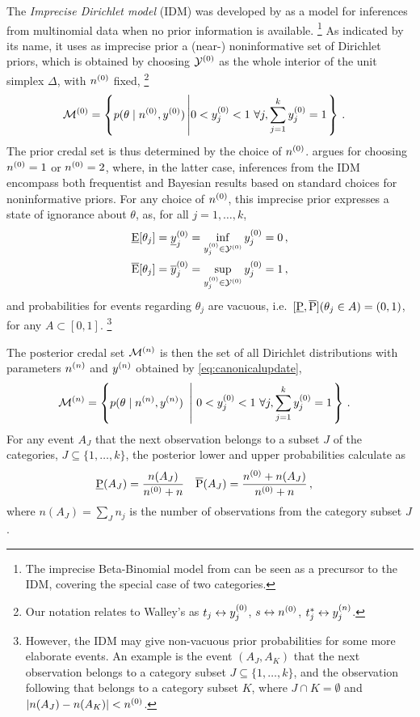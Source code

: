 The \emph{Imprecise Dirichlet model} (IDM) was developed by \textcite{1996:walley::idm}
as a model for inferences from multinomial data when no prior information is available.%
\footnote{The imprecise Beta-Binomial model from \textcite[\S 5.3.2]{1991:walley}
can be seen as a precursor to the IDM, covering the special case of two categories.}
As indicated by its name, it uses as imprecise prior a (near-) noninformative set of Dirichlet priors,
which is obtained by choosing $\mathcal{Y}^{(0)}$ as the whole interior of the unit simplex $\Delta$, with $n^{(0)}$ fixed,%
\footnote{Our notation relates to Walley's \parencite*{1996:walley::idm} as
$t_j \leftrightarrow y^{(0)}_j$, $s \leftrightarrow n^{(0)}$, $t^*_j \leftrightarrow y^{(n)}_j$.}
\begin{align*}
\MZ &= \left\{ p(\theta \mid \nz, \yz) \left| 0 < \yz_j < 1\ \forall j, \sum_{j=1}^k \yz_j = 1 \right. \right\}\,.
\end{align*}
The prior credal set is thus determined by the choice of $n^{(0)}$.
\Textcite{1996:walley::idm} argues for choosing $n^{(0)} = 1$ or $n^{(0)} = 2$, where, in the latter case,
inferences from the IDM encompass both frequentist and Bayesian results based on standard choices for noninformative priors.
For any choice of $n^{(0)}$, this imprecise prior expresses a state of ignorance about $\theta$,
as, for all $j = 1,\ldots, k$,
\begin{align*}
\underline{\operatorname{E}}[\theta_j] &= \underline{y}^{(0)}_j = \inf_{y^{(0)}_j \in \mathcal{Y}^{(0)}} y^{(0)}_j = 0\,,\\
\overline{\operatorname{E}}[\theta_j] &= \overline{y}^{(0)}_j = \sup_{y^{(0)}_j \in \mathcal{Y}^{(0)}} y^{(0)}_j = 1\,,
\end{align*}
and probabilities for events regarding $\theta_j$ are vacuous, i.e.\
$[\underline{\operatorname{P}},\overline{\operatorname{P}}](\theta_j \in A) = (0,1)$, for any $A \subset [0, 1]$.%
\footnote{However, the IDM may give non-vacuous prior probabilities for some more elaborate events.
An example \parencite[p.~14]{1996:walley::idm} is the event $(A_J, A_K)$
that the next observation belongs to a category subset $J \subseteq\{1, \ldots, k\}$,
and the observation following that belongs to a category subset $K$,
where $J \cap K = \emptyset$ and $|n(A_J) - n(A_K)| < n^{(0)}$.}

The posterior credal set $\mathcal{M}^{(n)}$ is then the set of all Dirichlet distributions
with parameters $n^{(n)}$ and $y^{(n)}$ obtained by \eqref{eq:canonicalupdate},
\begin{align*}
\mathcal{M}^{(n)} &= \left\{ p(\theta \mid n^{(n)}, y^{(n)}) \ \left| \  0 < y^{(0)}_j < 1\ \forall j, \sum_{j=1}^k y^{(0)}_j = 1 \right. \right\} \,.
\end{align*}
For any event $A_J$ that the next observation belongs to a subset $J$ of the categories, $J \subseteq\{1, \ldots, k\}$,
the posterior lower and upper probabilities calculate as
\begin{align*}
\underline{\operatorname{P}}(A_J) &= \frac{n(A_J)}{n^{(0)} + n} &
\overline{\operatorname{P}}(A_J) &= \frac{n^{(0)} + n(A_J)}{n^{(0)} + n}\,,
\end{align*}
where $n(A_J) = \sum_J n_j$ is the number of observations from the category subset $J$.

